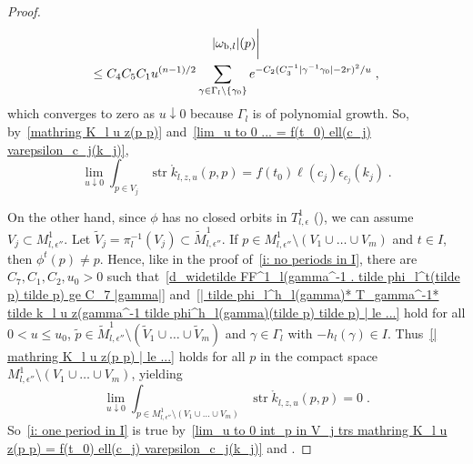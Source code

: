 \documentclass{memo-l}
\theoremstyle{plain}
\theoremstyle{definition}
\theoremstyle{remark}
\newcommand{\str}{\operatorname{str}}
\numberwithin{section}{chapter}
\numberwithin{equation}{section}%
\begin{document}
\begin{proof}
\begin{multline*}
|\omega_{\text{\rm b},l}|(p)\bigg|\\
\le C_4C_5C_1u^{(n-1)/2}\sum_{\gamma\in\Gamma_l\setminus\{\gamma_0\}}e^{-C_2(C_3^{-1}|\gamma^{-1}\gamma_0|-2r)^2/u}\;,
\end{multline*}
which converges to zero as $u\downarrow0$ because $\Gamma_l$ is of polynomial growth. So, by~\eqref{mathring K_l u z(p p)} and~\eqref{lim_u to 0 ... = f(t_0) ell(c_j) varepsilon_c_j(k_j)},
\begin{equation}\label{lim_u to 0 int_p in V_j trs mathring K_l u z(p p) = f(t_0) ell(c_j) varepsilon_c_j(k_j)}
\lim_{u\downarrow0}\int_{p\in V_j}\str\mathring k_{l,z,u}(p,p)=f(t_0)\ell(c_j)\epsilon_{c_j}(k_j)\;.
\end{equation}

On the other hand, since $\phi$ has no closed orbits in $T^1_{l,\epsilon}$ (), we can assume $V_j\subset M^1_{l,\epsilon''}$. Let $\widetilde V_j=\pi_l^{-1}(V_j)\subset\widetilde M^1_{l,\epsilon''}$. If $p\in M^1_{l,\epsilon''}\setminus(V_1\cup\dots\cup V_m)$ and $t\in I$, then $\phi^t(p)\ne p$. Hence, like in the proof of~\ref{i: no periods in I}, there are $C_7,C_1,C_2,u_0>0$ such that~\eqref{d_widetilde FF^1_l(gamma^-1 . tilde phi_l^t(tilde p) tilde p) ge C_7 |gamma|} and~\eqref{| tilde phi_l^h_l(gamma)* T_gamma^-1* tilde k_l u z(gamma^-1 tilde phi^h_l(gamma)(tilde p) tilde p) | le ...} hold for all $0<u\le u_0$, $\tilde p\in\widetilde M^1_{l,\epsilon''}\setminus(\widetilde V_1\cup\dots\cup\widetilde V_m)$ and $\gamma\in\Gamma_l$ with $-h_l(\gamma)\in I$. Thus~\eqref{| mathring K_l u z(p p) | le ...} holds for all $p$ in the compact space $M^1_{l,\epsilon''}\setminus(V_1\cup\dots\cup V_m)$, yielding
\[
\lim_{u\downarrow0}\int_{p\in M^1_{l,\epsilon''}\setminus(V_1\cup\dots\cup V_m)}\str\mathring k_{l,z,u}(p,p)=0\;.
\]
So~\ref{i: one period in I} is true by~\eqref{lim_u to 0 int_p in V_j trs mathring K_l u z(p p) = f(t_0) ell(c_j) varepsilon_c_j(k_j)} and .


\end{proof}
\end{document}
